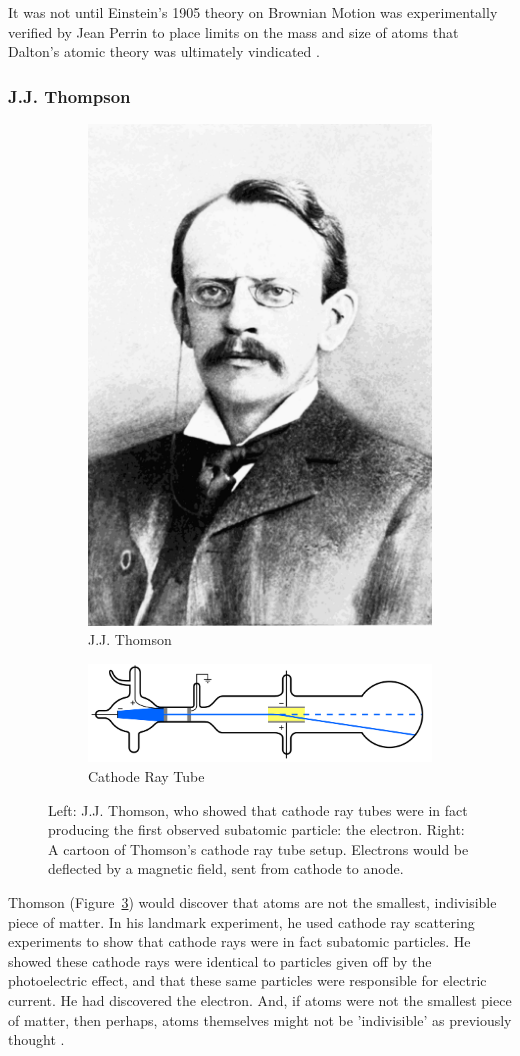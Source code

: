 It was not until Einstein's 1905 theory on Brownian Motion was experimentally
verified by Jean Perrin to place limits on the mass and size of atoms that
Dalton's atomic theory was ultimately vindicated \cite{Patterson200750}.

\subsubsection{J.J. Thompson}

\begin{figure}[ht]
	\centering
	\begin{subfigure}{.4\textwidth}
		\centering
		\includegraphics[width=0.4\linewidth]{./figures/jjthomson.png}
		\caption{J.J. Thomson  \cite{PopularScience1899}}
		\label{fig:thomsonportrait}
	\end{subfigure}%
	\begin{subfigure}{0.6\textwidth}
		\centering
		\includegraphics[width=0.4\linewidth]{./figures/cathoderaytube.png}
		\caption{Cathode Ray Tube  \cite{Kurzon2010}}
		\label{fig:thomsoncathode}
	\end{subfigure}
	\caption{ 
		Left: J.J. Thomson, who showed that cathode ray tubes were in fact producing
		the first observed subatomic particle: the electron. Right: A cartoon of
		Thomson's cathode ray tube setup. Electrons would be deflected by a magnetic
		field, sent from cathode to anode.
	}
	\label{fig:jjthomson}
\end{figure}

Thomson (Figure~\ref{fig:jjthomson}) would discover that atoms are not the
smallest, indivisible piece of matter. In his landmark experiment, he used
cathode ray scattering experiments to show that cathode rays were in fact
subatomic particles. He showed these cathode rays were identical to particles
given off by the photoelectric effect, and that these same particles were
responsible for electric current. He had discovered the electron. And, if atoms
were not the smallest piece of matter, then perhaps, atoms themselves might not
be 'indivisible' as previously thought \cite{nobelthomson2014}.

